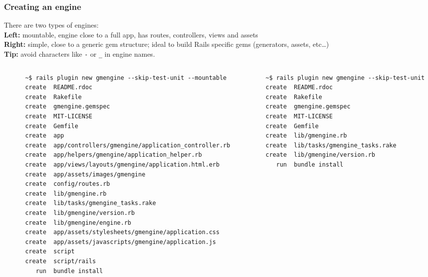 \documentclass[compress]{beamer}
\begin{document}
\begin{frame}[fragile]
\frametitle{Creating an engine}

\begin{center}
  \begin{tiny}
    There are two types of engines:
    \\
    \textbf{Left:} mountable, engine close to a full app, has routes, controllers, views and assets
    \\
    \textbf{Right:} simple, close to a generic gem structure; ideal to build Rails specific gems (generators, assets, etc\ldots)
    \\
    \textbf{Tip:} avoid characters like \texttt{-} or \texttt{\_} in engine names.
  \end{tiny}
\end{center}

\begin{columns}
  \begin{column}{0.6\textwidth}
    \begin{verbatim}
      ~$ rails plugin new gmengine --skip-test-unit --mountable
      create  README.rdoc
      create  Rakefile
      create  gmengine.gemspec
      create  MIT-LICENSE
      create  Gemfile
      create  app
      create  app/controllers/gmengine/application_controller.rb
      create  app/helpers/gmengine/application_helper.rb
      create  app/views/layouts/gmengine/application.html.erb
      create  app/assets/images/gmengine
      create  config/routes.rb
      create  lib/gmengine.rb
      create  lib/tasks/gmengine_tasks.rake
      create  lib/gmengine/version.rb
      create  lib/gmengine/engine.rb
      create  app/assets/stylesheets/gmengine/application.css
      create  app/assets/javascripts/gmengine/application.js
      create  script
      create  script/rails
         run  bundle install
    \end{verbatim}
  \end{column}

  \begin{column}{0.4\textwidth}
    \begin{verbatim}
      ~$ rails plugin new gmengine --skip-test-unit
      create  README.rdoc
      create  Rakefile
      create  gmengine.gemspec
      create  MIT-LICENSE
      create  Gemfile
      create  lib/gmengine.rb
      create  lib/tasks/gmengine_tasks.rake
      create  lib/gmengine/version.rb
         run  bundle install
    \end{verbatim}
    \end{column}
  \end{columns}
\end{frame}
\end{document}
